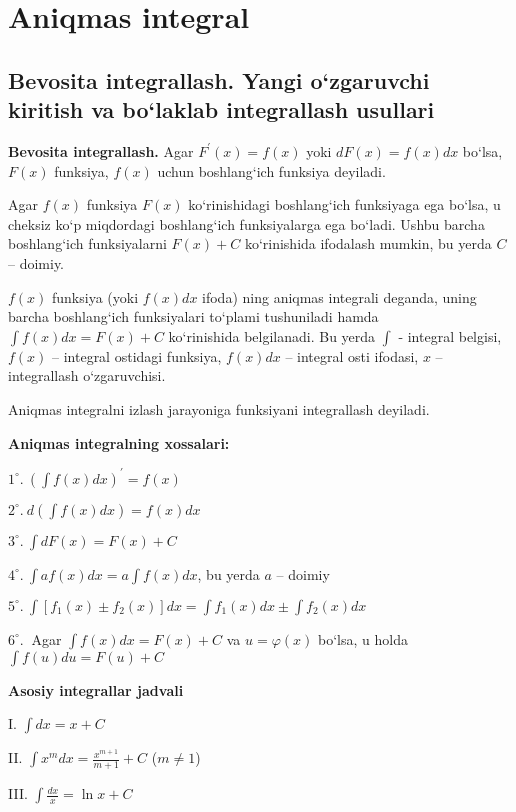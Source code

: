 \chapter{Aniqmas integral}
\section{Bevosita integrallash. Yangi o`zgaruvchi kiritish va bo`laklab integrallash usullari}
\hspace{0.6cm}
\textbf{Bevosita integrallash.} 
Agar $F^{\prime}(x)=f(x)$ yoki $dF(x)=f(x)dx$ bo`lsa, $F(x)$ funksiya, $f(x)$ uchun boshlang`ich funksiya deyiladi. 

\hspace{0.6cm}Agar $f(x)$ funksiya $F(x)$ ko`rinishidagi boshlang`ich funksiyaga ega bo`lsa, u cheksiz ko`p miqdordagi boshlang`ich funksiyalarga ega bo`ladi. Ushbu barcha boshlang`ich funksiyalarni $F(x)+C$ ko`rinishida ifodalash mumkin, bu yerda $C$ -- doimiy.


$f(x)$ funksiya (yoki $f(x)dx$ ifoda) ning aniqmas integrali deganda, uning barcha boshlang`ich funksiyalari to`plami tushuniladi hamda $\int f(x)dx=F(x)+C$ ko`rinishida belgilanadi. 
Bu yerda $\int$ - integral belgisi, $f(x)$ -- integral ostidagi funksiya, $f(x)dx$ -- integral osti ifodasi, $x$ -- integrallash o`zgaruvchisi.

Aniqmas integralni izlash jarayoniga funksiyani integrallash deyiladi.

\textbf{Aniqmas integralning xossalari:}

$1^{\circ}.\  \left(\int f(x)dx\right)^{\prime}=f(x)$ \label{1-xossa}

$2^{\circ}.\  d\left(\int f(x)dx\right)=f(x)dx$\label{2-xossa}

$3^{\circ}.\ \int dF(x)=F(x)+C$\label{3-xossa}

$4^{\circ}.\ \int af(x)dx=a\int f(x)dx$, bu yerda $a$ -- doimiy\label{4-xossa}

$5^{\circ}.\ \int\left[f_{1}(x)\pm f_{2}(x)\right]dx=\int f_{1}(x)dx\pm \int f_{2}(x)dx$ \label{5-xossa}

$6^{\circ}.\ $ Agar $\int f(x)dx=F(x)+C$ va $u=\varphi(x)$ bo`lsa, u holda $\int f(u)du=F(u)+C$\label{6-xossa}

\textbf{Asosiy integrallar jadvali}


I. $\int dx=x+C$

II. $\int x^{m}dx=\frac{x^{m+1}}{m+1}+C$ ($m\ne1$)

III. $\int \frac{dx}{x}=\ln{x}+C$

